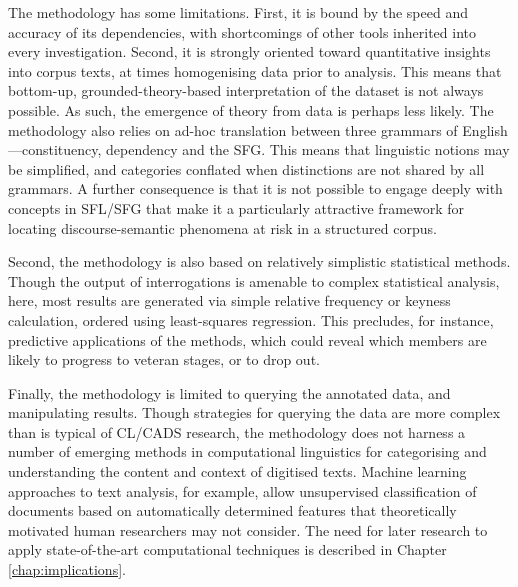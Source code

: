 The methodology has some limitations. First, it is bound by the speed and accuracy of its dependencies, with shortcomings of other tools inherited into every investigation. Second, it is strongly oriented toward quantitative insights into \gls{corpus} texts, at times homogenising data prior to analysis. This means that bottom\hyp{}up, grounded\hyp{}theory\hyp{}based interpretation of the dataset is not always possible. As such, the emergence of theory from data is perhaps less likely. The methodology also relies on ad\hyp{}hoc translation between three grammars of English---constituency, dependency and the \gls{SFG}. This means that linguistic notions may be simplified, and categories conflated when distinctions are not shared by all grammars. A further consequence is that it is not possible to engage deeply with concepts in \gls{SFL}\slash \gls{SFG} that make it a particularly attractive framework for locating \gls{discourse-semantic} phenomena at risk in a structured \gls{corpus}.

Second, the methodology is also based on relatively simplistic statistical methods. Though the output of interrogations is amenable to complex statistical analysis, here, most results are generated via simple relative frequency or keyness calculation, ordered using least\hyp{}squares regression. This precludes, for instance, predictive applications of the methods, which could reveal which members are likely to progress to veteran stages, or to drop out.

Finally, the methodology is limited to querying the annotated data, and manipulating results. Though strategies for querying the data are more complex than is typical of \gls{CL}\slash \gls{CADS} research, the methodology does not harness a number of emerging methods in computational linguistics for categorising and understanding the content and context of digitised texts. Machine learning approaches to text analysis, for example, allow unsupervised classification of documents based on automatically determined features that theoretically motivated human researchers may not consider. The need for later research to apply state\hyp{}of\hyp{}the\hyp{}art computational techniques is described in Chapter \ref{chap:implications}.




